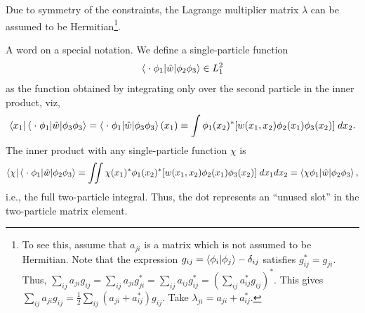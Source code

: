 \documentclass{report}
\theoremstyle{plain}
\theoremstyle{definition}
\begin{document}
Due to symmetry of the constraints, the Lagrange multiplier matrix
$\lambda$ can be assumed to be Hermitian\footnote{To see this, assume
  that $a_{ji}$ is a matrix which is not assumed to be Hermitian. Note
  that the expression $g_{ij} = \braket{\phi_i|\phi_j}-\delta_{ij}$
  satisfies $g_{ij}^* = g_{ji}$. Thus, $\sum_{ij} a_{ji} g_{ij} =
  \sum_{ij} a_{ji} g_{ji}^* = \sum_{ij} a_{ij} g_{ij}^* = (\sum_{ij}
  a_{ij}^* g_{ij})^*$. This gives $\sum_{ij} a_{ji}g_{ij} =
  \tfrac{1}{2}\sum_{ij}(a_{ji}+a_{ij}^*)g_{ij}$. Take $\lambda_{ji}=
  a_{ji}+a_{ij}^*$.}. 


A word on a special notation. We define a single-particle function
\begin{equation}
  \braket{\;\cdot\; \phi_1|\hat{w}|\phi_2\phi_3} \in L^2_1
\end{equation}
as the function obtained by integrating only over the
second particle in the inner product, viz,
\begin{equation}
  \bra{x_1}\braket{\;\cdot\; \phi_1|\hat{w}|\phi_3 \phi_3} = \braket{\;\cdot\; \phi_1|\hat{w}|\phi_3 \phi_3}(x_1) \equiv \int
  \phi_1(x_2)^* [w(x_1,x_2) \phi_2(x_1)\phi_3(x_2)] \; dx_2.
\end{equation}
The inner product with any single-particle function $\chi$ is
\begin{equation}
  \bra{\chi}\braket{\;\cdot\; \phi_1|\hat{w}|\phi_2 \phi_3} = \iint
  \chi(x_1)^* \phi_1(x_2)^* [w(x_1,x_2) \phi_2(x_1)\phi_3(x_2)] \; dx_1
  dx_2 = \braket{\chi\phi_1|\hat{w}|\phi_2\phi_3},
\end{equation}
i.e., the full two-particle integral. Thus, the dot represents an
``unused slot'' in the two-particle matrix element. 
\end{document}
